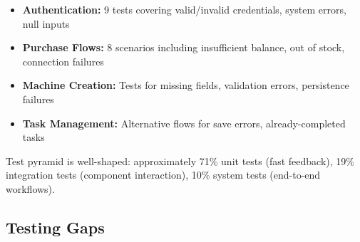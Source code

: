 \documentclass[11pt,a4paper]{article}
\begin{document}
\begin{tcolorbox}[colback=strengthgreen!5,colframe=strengthgreen,title=\textbf{Comprehensive Error Path Testing}]
\begin{itemize}[leftmargin=*]
    \item \textbf{Authentication:} 9 tests covering valid/invalid credentials, system errors, null inputs
    \item \textbf{Purchase Flows:} 8 scenarios including insufficient balance, out of stock, connection failures
    \item \textbf{Machine Creation:} Tests for missing fields, validation errors, persistence failures
    \item \textbf{Task Management:} Alternative flows for save errors, already-completed tasks
\end{itemize}
\end{tcolorbox}

Test pyramid is well-shaped: approximately 71\% unit tests (fast feedback), 19\% integration tests (component interaction), 10\% system tests (end-to-end workflows).

\subsection{Testing Gaps}
\end{document}
